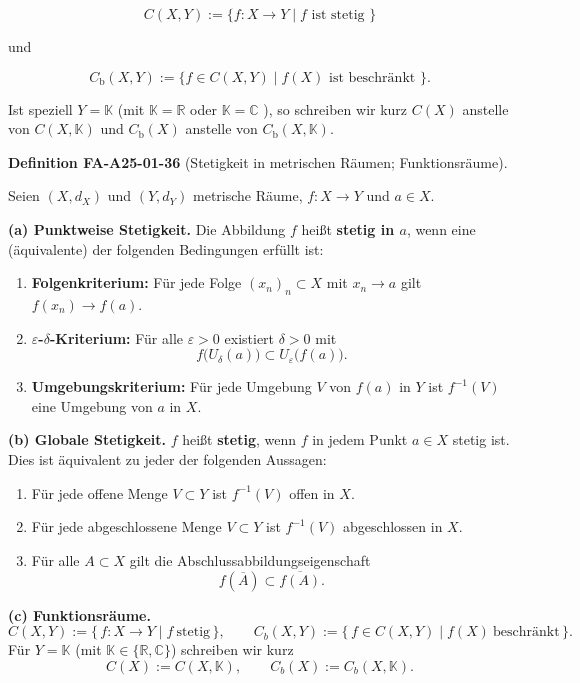 \documentclass[10pt, letterpaper]{article}
\newcommand{\CustomHeading}[3]{%
  \par\medskip\noindent%
  \textbf{#1 #2} \textnormal{(#3)}.\enskip%
}
\newenvironment{DEF}[2]{\begin{unitbox}\CustomHeading{Definition}{#1}{#2}}{\end{unitbox}}
\begin{document}
$$
C(X, Y):=\{f: X \rightarrow Y \mid f \text { ist stetig }\}
$$

und

$$
C_{\mathrm{b}}(X, Y):=\{f \in C(X, Y) \mid f(X) \text { ist beschränkt }\} .
$$

Ist speziell $Y=\mathbb{K}$ (mit $\mathbb{K}=\mathbb{R}$ oder $\mathbb{K}=\mathbb{C}$ ), so schreiben wir kurz $C(X)$ anstelle von $C(X, \mathbb{K})$ und $C_{\mathrm{b}}(X)$ anstelle von $C_{\mathrm{b}}(X, \mathbb{K})$.



\begin{DEF}{FA-A25-01-36}{Stetigkeit in metrischen Räumen; Funktionsräume}
Seien $(X,d_X)$ und $(Y,d_Y)$ metrische Räume, $f:X\to Y$ und $a\in X$.

\textbf{(a) Punktweise Stetigkeit.}
Die Abbildung $f$ heißt \textbf{stetig in $a$}, wenn eine (äquivalente) der folgenden Bedingungen erfüllt ist:
\begin{enumerate}
\item \textbf{Folgenkriterium:} Für jede Folge $(x_n)_n\subset X$ mit $x_n\to a$ gilt $f(x_n)\to f(a)$.
\item \textbf{$\varepsilon$-$\delta$-Kriterium:} Für alle $\varepsilon>0$ existiert $\delta>0$ mit
      \[
      f\big(U_\delta(a)\big)\subset U_\varepsilon\big(f(a)\big).
      \]
\item \textbf{Umgebungskriterium:} Für jede Umgebung $V$ von $f(a)$ in $Y$ ist $f^{-1}(V)$ eine Umgebung von $a$ in $X$.
\end{enumerate}

\textbf{(b) Globale Stetigkeit.}
$f$ heißt \textbf{stetig}, wenn $f$ in jedem Punkt $a\in X$ stetig ist. Dies ist äquivalent zu jeder der folgenden Aussagen:
\begin{enumerate}
\item Für jede offene Menge $V\subset Y$ ist $f^{-1}(V)$ offen in $X$.
\item Für jede abgeschlossene Menge $V\subset Y$ ist $f^{-1}(V)$ abgeschlossen in $X$.
\item Für alle $A\subset X$ gilt die Abschlussabbildungseigenschaft
      \[
      f(\overline{A})\subset \overline{f(A)}.
      \]
\end{enumerate}

\textbf{(c) Funktionsräume.}
\[
C(X,Y):=\{\,f:X\to Y\mid f\ \text{stetig}\,\},\qquad
C_b(X,Y):=\{\,f\in C(X,Y)\mid f(X)\ \text{beschränkt}\,\}.
\]
Für $Y=\mathbb{K}$ (mit $\mathbb{K}\in\{\mathbb{R},\mathbb{C}\}$) schreiben wir kurz
\[
C(X):=C(X,\mathbb{K}),\qquad C_b(X):=C_b(X,\mathbb{K}).
\]
\end{DEF}
\end{document}
